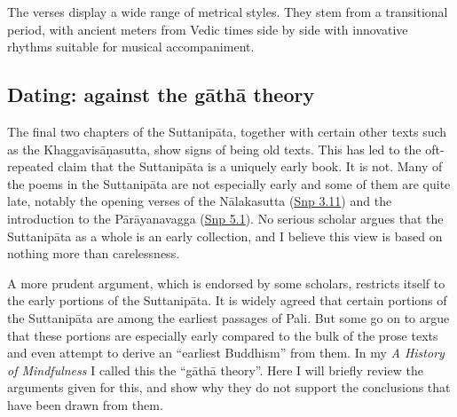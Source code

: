 \documentclass[12pt,openany]{book}%
\begin{document}
The verses display a wide range of metrical styles. They stem from a transitional period, with ancient meters from Vedic times side by side with innovative rhythms suitable for musical accompaniment.

\subsection*{Dating: against the \textsanskrit{gāthā} theory}

The final two chapters of the \textsanskrit{Suttanipāta}, together with certain other texts such as the \textsanskrit{Khaggavisāṇasutta}, show signs of being old texts. This has led to the oft-repeated claim that the \textsanskrit{Suttanipāta} is a uniquely early book. It is not. Many of the poems in the \textsanskrit{Suttanipāta} are not especially early and some of them are quite late, notably the opening verses of the \textsanskrit{Nālakasutta} (\href{https://suttacentral.net/snp3.11/en/sujato}{Snp 3.11}) and the introduction to the \textsanskrit{Pārāyanavagga} (\href{https://suttacentral.net/snp5.1/en/sujato}{Snp 5.1}). No serious scholar argues that the \textsanskrit{Suttanipāta} as a whole is an early collection, and I believe this view is based on nothing more than carelessness.

A more prudent argument, which is endorsed by some scholars, restricts itself to the early portions of the \textsanskrit{Suttanipāta}. It is widely agreed that certain portions of the \textsanskrit{Suttanipāta} are among the earliest passages of Pali. But some go on to argue that these portions are especially early compared to the bulk of the prose texts and even attempt to derive an “earliest Buddhism” from them. In my \textit{A History of Mindfulness} I called this the “\textsanskrit{gāthā} theory”. Here I will briefly review the arguments given for this, and show why they do not support the conclusions that have been drawn from them.
\end{document}
